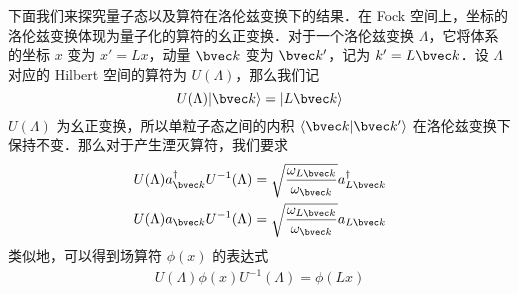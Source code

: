 下面我们来探究量子态以及算符在洛伦兹变换下的结果．在 Fock 空间上，坐标的洛伦兹变换体现为量子化的算符的幺正变换．对于一个洛伦兹变换 $\Lambda$，它将体系的坐标 $x$ 变为 $x'=L x$，动量 $\bvec k$ 变为 $\bvec k'$，记为 $k'=L \bvec k$．设 $\Lambda$ 对应的 Hilbert 空间的算符为 $U(\Lambda)$，那么我们记
\begin{equation}
U(\Lambda)|\bvec k\rangle=|L \bvec k\rangle
\end{equation}
$U(\Lambda)$ 为幺正变换，所以单粒子态之间的内积 $\langle \bvec k|\bvec k'\rangle$ 在洛伦兹变换下保持不变．那么对于产生湮灭算符，我们要求
\begin{equation}
\begin{aligned}
&U(\Lambda)a^\dagger_{\bvec k}U^{-1}(\Lambda)=\sqrt{\frac{\omega_{L \bvec k}}{\omega_{\bvec k}}} a^\dagger_{L \bvec k}\\
&U(\Lambda)a_{\bvec k}U^{-1}(\Lambda)=\sqrt{\frac{\omega_{L \bvec k}}{\omega_{\bvec k}}} a_{L \bvec k}
\end{aligned}
\end{equation}
类似地，可以得到场算符 $\phi(x)$ 的表达式
\begin{equation}\label{quanti_eq4}
\begin{aligned}
U(\Lambda)\phi(x)U^{-1}(\Lambda)=\phi(Lx)
\end{aligned}
\end{equation}

